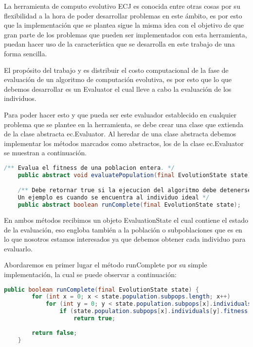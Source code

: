 La herramienta de computo evolutivo ECJ es conocida entre otras cosas por su flexibilidad a la hora de poder desarrollar problemas en este ámbito, es por esto que la implementación que se plantea sigue la misma idea con el objetivo de que gran parte de los problemas que pueden ser implementados con esta herramienta, puedan hacer uso de la característica que se desarrolla en este trabajo de una forma sencilla.
\label{desarrollo-implementacion}

El propósito del trabajo y es distribuir el costo computacional de la fase de evaluación de un algoritmo de computación evolutiva, es por esto que lo que debemos desarrollar es un Evaluator  el cual lleve a cabo la evaluación de los individuos.

Para poder hacer esto y que pueda ser este evaluador establecido en cualquier problema que se plantee en la herramienta, se debe crear una clase que extienda de la clase abstracta ec.Evaluator. Al heredar de una clase abstracta debemos implementar los métodos marcados como abstractos, los de la clase ec.Evaluator se muestran a continuación.

\begin{lstlisting}[language=Java]
    /** Evalua el fitness de una poblacion entera. */
    public abstract void evaluatePopulation(final EvolutionState state);

    /** Debe retornar true si la ejecucion del algoritmo debe detenerse por algun motivo.
    Un ejemplo es cuando se encuentra al individuo ideal */
    public abstract boolean runComplete(final EvolutionState state);
\end{lstlisting}

En ambos métodos recibimos un objeto EvaluationState el cual contiene el estado de la evaluación, eso engloba también a la población o subpoblaciones que es en lo que nosotros estamos interesados ya que debemos obtener cada individuo para evaluarlo.

Abordaremos en primer lugar el método runComplete por su simple implementación, la cual se puede observar a continuación:

\begin{lstlisting}[language=Java]
	public boolean runComplete(final EvolutionState state) {
		for (int x = 0; x < state.population.subpops.length; x++)
			for (int y = 0; y < state.population.subpops[x].individuals.length; y++)
				if (state.population.subpops[x].individuals[y].fitness.isIdealFitness())
					return true;
		
		return false;
	}
\end{lstlisting}

